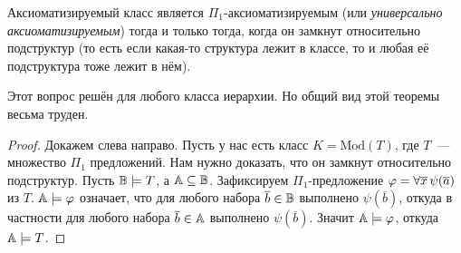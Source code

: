 \begin{theorem}
    Аксиоматизируемый класс является $\Pi_1$-аксиоматизируемым (или \emph{универсально аксиоматизируемым}) тогда и только тогда, когда он замкнут относительно подструктур (то есть если какая-то структура лежит в классе, то и любая её подструктура тоже лежит в нём).
\end{theorem}
\begin{remark}
    Этот вопрос решён для любого класса иерархии. Но общий вид этой теоремы весьма труден.
\end{remark}
\begin{proof}
    Докажем слева направо. Пусть у нас есть класс $K = \text{Mod}(T)$, где $T$~— множество $\Pi_1$ предложений. Нам нужно доказать, что он замкнут относительно подструктур.
    Пусть ${\mathbb B}\models T$, а ${\mathbb A}\subseteq{\mathbb B}$. Зафиксируем $\Pi_1$-предложение $\varphi=\forall\overline{x}\,\psi(\overline{a})$ из $T$. ${\mathbb A}\models\varphi$ означает, что для любого набора $\overline{b}\in{\mathbb B}$ выполнено $\psi(\overline{b})$, откуда в частности для любого набора $\overline{b}\in{\mathbb A}$ выполнено $\psi(\overline{b})$. Значит ${\mathbb A}\models\varphi$, откуда ${\mathbb A}\models T$.
\end{proof}
